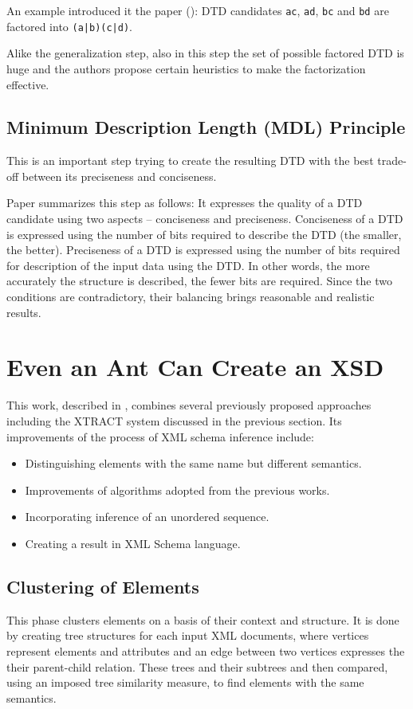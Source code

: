An example introduced it the paper (\cite{Garofalakis:2000:XSE:342009.335409}): DTD candidates \texttt{ac}, \texttt{ad}, \texttt{bc} and \texttt{bd} are factored into \texttt{(a|b)(c|d)}.

Alike the generalization step, also in this step the set of possible factored DTD is huge and the authors propose certain heuristics to make the factorization effective.

\subsection{Minimum Description Length (MDL) Principle}
This is an important step trying to create the resulting DTD with the best trade-off between its preciseness and conciseness.  

Paper \cite{Mlynkova:2008:AAX:1494650.1495496} summarizes this step as follows: It expresses the quality of a DTD candidate using two aspects – conciseness and preciseness. Conciseness of a DTD is expressed using the number of bits required to describe the DTD (the smaller, the better). Preciseness of a DTD is expressed using the number of bits required for description of the input data using the DTD. In other words, the more accurately the structure is described, the fewer bits are required. Since the two conditions are contradictory, their balancing brings reasonable and realistic results.


\section{Even an Ant Can Create an XSD}
This work, described in \cite{Vosta:2008:EAC:1802514.1802522}, combines several previously proposed approaches including the XTRACT system discussed in the previous section. Its improvements of the process of XML schema inference include:

\begin{itemize}
\item Distinguishing elements with the same name but different semantics.
\item Improvements of algorithms adopted from the previous works.
\item Incorporating inference of an unordered sequence.
\item Creating a result in XML Schema language.
\end{itemize}

\subsection{Clustering of Elements}
This phase clusters elements on a basis of their context and structure. It is done by creating tree structures for each input XML documents, where vertices represent elements and attributes and an edge between two vertices expresses the their parent-child relation. These trees and their subtrees and then compared, using an imposed tree similarity measure, to find elements with the same semantics.


